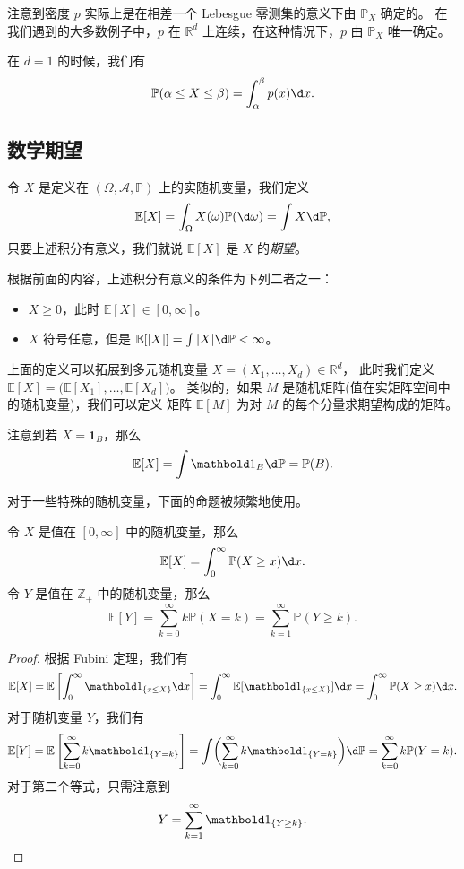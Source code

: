 \documentclass[fontset=none]{Notes}
\begin{document}
注意到密度 $p$ 实际上是在相差一个 Lebesgue 零测集的意义下由 $\mathbb{P}_X$ 确定的。
在我们遇到的大多数例子中，$p$ 在 $\mathbb{R}^d$ 上连续，在这种情况下，$p$ 由
$\mathbb{P}_X$ 唯一确定。

在 $d=1$ 的时候，我们有
\[
  \mathbb{P}(\alpha\leq X\leq \beta)=\int_{\alpha}^\beta p(x)\d x.
\]

\subsection{数学期望}

\begin{definition}
  令 $X$ 是定义在 $(\Omega,\mathcal{A},\mathbb{P})$ 上的实随机变量，我们定义
  \[
    \mathbb{E}[X]=\int_\Omega X(\omega)\mathbb{P}(\d\omega)=\int X\d \mathbb{P},
  \]
  只要上述积分有意义，我们就说 $\mathbb{E}[X]$ 是 $X$ 的\emph{期望}。
\end{definition}

根据前面的内容，上述积分有意义的条件为下列二者之一：
\begin{itemize}[nosep]
  \item $X\geq 0$，此时 $\mathbb{E}[X]\in [0,\infty]$。
  \item $X$ 符号任意，但是 $\mathbb{E}[|X|]=\int|X| \d \mathbb{P}<\infty$。
\end{itemize}


上面的定义可以拓展到多元随机变量 $X=(X_1,\dots,X_d)\in \mathbb{R}^d$，
此时我们定义 $\mathbb{E}[X]=\bigl(\mathbb{E}[X_1],\dots,\mathbb{E}[X_d]\bigr)$。
类似的，如果 $M$ 是随机矩阵(值在实矩阵空间中的随机变量)，我们可以定义
矩阵 $\mathbb{E}[M]$ 为对 $M$ 的每个分量求期望构成的矩阵。

注意到若 $X=\mathbold 1_B$，那么
\[
  \mathbb{E}[X]=\int\mathbold 1_B \d \mathbb{P}=\mathbb{P}(B).
\]

对于一些特殊的随机变量，下面的命题被频繁地使用。

\begin{proposition}
  令 $X$ 是值在 $[0,\infty]$ 中的随机变量，那么
  \[
    \mathbb{E}[X]=\int_0^\infty \mathbb{P}(X\geq x) \d x.
  \]
  令 $Y$ 是值在 $\mathbb{Z}_+$ 中的随机变量，那么
  \[
    \mathbb{E}[Y]=\sum_{k=0}^\infty k \mathbb{P}(X=k)=\sum_{k=1}^\infty \mathbb{P}(Y\geq k).
  \]
\end{proposition}
\begin{proof}
  根据 Fubini 定理，我们有
  \[
    \mathbb{E}[X]=\mathbb{E}\left[
      \int_0^\infty \mathbold 1_{\{x\leq X\}}\d x
    \right]=\int_0^\infty \mathbb{E}[\mathbold 1_{\{x\leq X\}}] \d x
    =\int_0^\infty \mathbb{P}(X\geq x) \d x.
  \]
  对于随机变量 $Y$，我们有
  \[
    \mathbb{E}[Y]=\mathbb{E}\left[
      \sum_{k=0}^\infty k\mathbold 1_{\{Y=k\}}
    \right]=\int \biggl(\sum_{k=0}^\infty k\mathbold 1_{\{Y=k\}}\biggr)\d \mathbb{P}
    =\sum_{k=0}^\infty k \mathbb{P}(Y=k).
  \]
  对于第二个等式，只需注意到
  \[
    Y=\sum_{k=1}^\infty \mathbold 1_{\{Y\geq k\}}.\qedhere
  \]
\end{proof}
\end{document}

